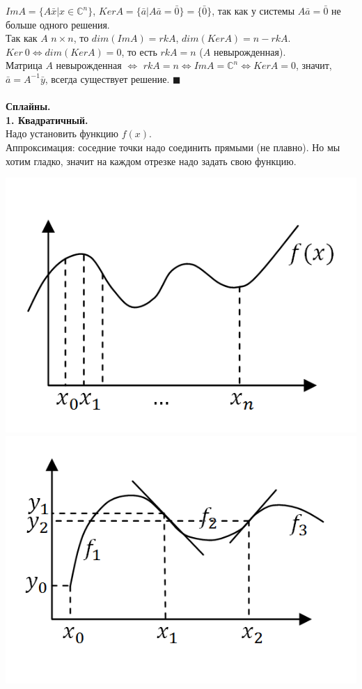 \documentclass[12pt]{article}
\theoremstyle{definition}
\numberwithin{equation}{section}
\begin{document}
	$Im A = \{ A \bar x | x\in \mathbb{C}^n \} $, 
	$Ker A = \{\bar a | A \bar a = \bar 0 \} = \{\bar 0 \} $, так как у системы $A \bar a = \bar 0$ не больше одного решения.\\
	Так как $A$ $n \times n$, то 
	$dim(Im A) = rk A$, $dim(Ker A) = n-rk A$.\\ 
	$Ker~ 0 \Leftrightarrow dim(Ker A) = 0$, то есть $rk A = n$ ($A$ невырожденная). \\
	Матрица $A$ невырожденная $\Leftrightarrow$ $rk A = n \Leftrightarrow Im A = \mathbb{C}^n \Leftrightarrow Ker A = 0$, значит, $\bar a = A^{-1}\bar y$, всегда существует решение. $\blacksquare$\\
	\\
	\noindent \textbf{Сплайны.}\\
	\noindent \textbf{1. Квадратичный.}\\
	Надо установить функцию $f(x)$.\\
	Аппроксимация: соседние точки надо соединить прямыми (не плавно). Но мы хотим гладко, значит на каждом отрезке надо задать свою функцию.\begin{center} \includegraphics[scale=0.6]{l3_3.png}\\
		\includegraphics[scale=0.6]{l3_4.png}\end{center}
\end{document}
